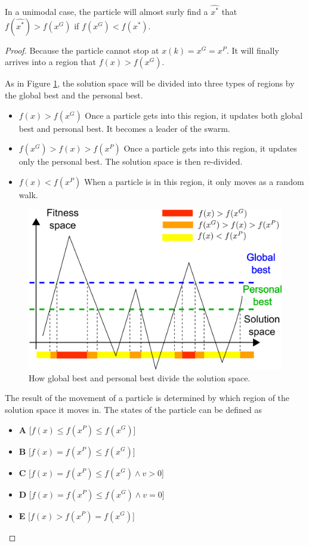 \begin{mythm}
\label{thm:singleHill:particle:better}
In a unimodal case, the particle will almost surly find a $ \hat{x^{*}} $ that $ f(\hat{x^{*}}) > f(x^{G}) $ if $ f( x^{G} ) < f( x^{*}) $.
\begin{proof}
Because the particle cannot stop at $ x(k) = x^{G} = x^{P} $.
It will finally arrives into a region that $ f(x) > f(x^{G}) $.

As in Figure \ref{fig:categorize_regions}, the solution space will be divided into three types of regions by the global best and the personal best.
\begin{itemize}
\item $ f(x) > f(x^G) $
Once a particle gets into this region, it updates both global best and personal best. 
It becomes a leader of the swarm.
\item $ f(x^{G}) > f(x) > f(x^{P}) $
Once a particle gets into this region, it updates only the personal best.
The solution space is then re-divided.
\item $ f(x) < f(x^{P}) $
When a particle is in this region, it only moves as a random walk.
\end{itemize}

\begin{figure}
\centering
\includegraphics[width=0.7\linewidth]{./fig/categorize_regions}
\caption{How global best and personal best divide the solution space.}
\label{fig:categorize_regions}
\end{figure}

The result of the movement of a particle is determined by which region of the solution space it moves in.
The states of the particle can be defined as
\begin{itemize}
\item \textbf{A} [$ f(x) \leq f(x^{P}) \leq f(x^{G}) $]
\item \textbf{B} [$ f(x) = f(x^{P}) \leq f(x^{G}) $] 
\item \textbf{C} [$ f(x) = f(x^{P}) \leq f(x^{G}) \land v > 0 $]
\item \textbf{D} [$ f(x) = f(x^{P}) \leq f(x^{G}) \land v = 0 $]
\item \textbf{E} [$ f(x) > f(x^{P}) = f(x^{G}) $]
\end{itemize}


\end{proof}
\end{mythm}
